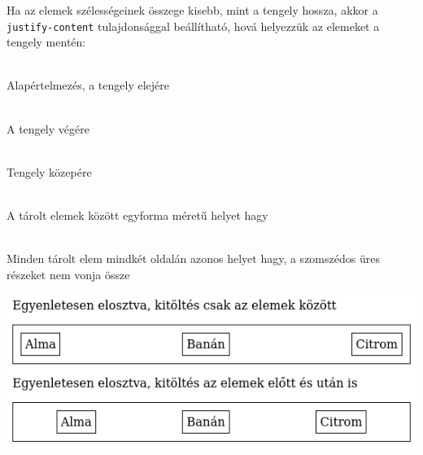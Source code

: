 %
\begin{frame}
  Ha az elemek szélességeinek összege kisebb, mint a tengely hossza, akkor a \texttt{justify-content} tulajdonsággal beállítható, hová helyezzük az elemeket a tengely mentén:
  \begin{description}[m]
    \item[\texttt{flex-start}] \hfill \\ Alapértelmezés, a tengely elejére
    \item[\texttt{flex-end}] \hfill \\ A tengely végére
    \item[\texttt{center}] \hfill \\ Tengely közepére
    \item[\texttt{space-between}] \hfill \\ A tárolt elemek között egyforma méretű helyet hagy
    \item[\texttt{space-around}] \hfill \\ Minden tárolt elem mindkét oldalán azonos helyet hagy, a szomszédos üres részeket nem vonja össze
  \end{description}
\end{frame}

%
\begin{frame}
  \begin{exampleblock}{}
    \scriptsize
    
  \end{exampleblock}
\end{frame}

%
\begin{frame}
  \begin{center}
    \includegraphics[width=.75\textwidth]{justify-content-space-between.png}
  \end{center}
\end{frame}

